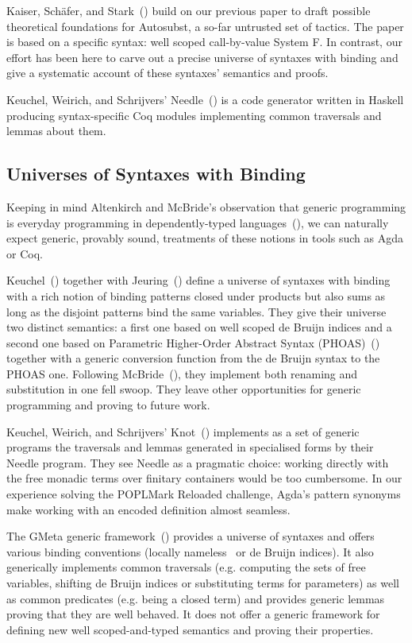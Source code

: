 Kaiser, Schäfer, and Stark~(\citeyear{Kaiser-wsdebr}) build on our previous paper
to draft possible theoretical foundations for Autosubst, a so-far untrusted
set of tactics. The paper is based on a specific syntax: well scoped call-by-value
System F. In contrast, our effort has been here to carve out
a precise universe of syntaxes with binding and give a systematic account
of these syntaxes' semantics and proofs.

Keuchel, Weirich, and Schrijvers' Needle~(\citeyear{needleandknot}) is a code
generator written in Haskell producing syntax-specific Coq modules
implementing common traversals and lemmas about them.

\subsection{Universes of Syntaxes with Binding} Keeping in mind Altenkirch
and McBride's observation that generic programming is everyday programming
in dependently-typed languages~(\citeyear{DBLP:conf/ifip2-1/AltenkirchM02}),
we can naturally
expect generic, provably sound, treatments of these notions in tools such as
Agda or Coq.

Keuchel~(\citeyear{Keuchel:Thesis:2011}) together with
Jeuring~(\citeyear{DBLP:conf/icfp/KeuchelJ12})
define a universe of syntaxes with binding with a rich notion of binding
patterns closed under products but also sums as long as the disjoint
patterns bind the same variables.
%
They give their universe two distinct semantics: a first one based on well
scoped de Bruijn indices and a second one based on Parametric Higher-Order
Abstract Syntax (PHOAS)~(\cite{DBLP:conf/icfp/Chlipala08}) together with
a generic conversion function from the de Bruijn syntax to the PHOAS one.
%
Following McBride~(\citeyear{mcbride2005type}), they implement both renaming
and substitution in one fell swoop. They leave other
opportunities for generic programming and proving to future work.

Keuchel, Weirich, and Schrijvers' Knot~(\citeyear{needleandknot}) implements
as a set of generic programs the traversals and lemmas generated in specialised
forms by their Needle program. They see Needle as a pragmatic choice: working
directly with the free monadic terms over finitary containers would be too
cumbersome. In
our experience solving the POPLMark Reloaded challenge, Agda's pattern
synonyms make working with an encoded definition almost
seamless.

The GMeta generic framework~(\citeyear{gmeta}) provides a universe of syntaxes
and offers various binding conventions (locally nameless~\cite{Chargueraud2012}
or de Bruijn indices).
%
It also generically implements common traversals (e.g. computing
the sets of free variables,
shifting
de Bruijn indices or substituting terms for parameters) as well as common
predicates (e.g. being a closed term) and provides generic lemmas proving that
they are well behaved. It does not offer a generic framework
for defining new well scoped-and-typed semantics and proving their properties.


